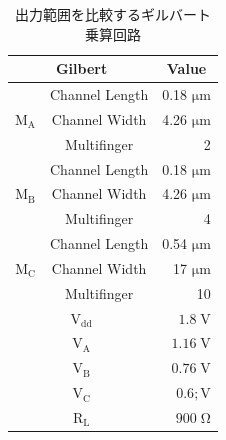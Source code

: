         \begin{table}[!b]
                \centering
                \caption{出力範囲を比較するギルバート乗算回路}
                \label{table:3_prev_com_param}
                \begin{tabular}{c|c|r}
                    \hline
                    \multicolumn{2}{c}{Gilbert}   & \multicolumn{1}{c}{Value}     \\
                    \hline\hline
                    &   Channel Length   &   0.18 $\mathrm{\mu m}$   \\
                    \cline{2-3}
                    $\mathrm{M_{A}}$   &   Channel Width   &   4.26 $\mathrm{\mu m}$   \\
                    \cline{2-3}
                        &   Multifinger   & 2    \\
                    \hline
                    &   Channel Length   &   0.18 $\mathrm{\mu m}$   \\
                    \cline{2-3}
                    $\mathrm{M_{B}}$   &   Channel Width   &   4.26 $\mathrm{\mu m}$   \\
                    \cline{2-3}
                        &   Multifinger   & 4    \\
                    \hline
                    &   Channel Length   &   0.54 $\mathrm{\mu m}$   \\
                    \cline{2-3}
                    $\mathrm{M_{C}}$   &   Channel Width   &   17 $\mathrm{\mu m}$   \\
                    \cline{2-3}
                        &   Multifinger   & 10    \\
                    \hline
                    \multicolumn{2}{c|}{$\mathrm{V_{dd}}$} &   $1.8\;\mathrm{V}$   \\
                    \hline
                    \multicolumn{2}{c|}{$\mathrm{V_{A}}$} &   $1.16\;\mathrm{V}$   \\
                    \hline
                    \multicolumn{2}{c|}{$\mathrm{V_{B}}$} &   $0.76\;\mathrm{V}$   \\
                    \hline
                    \multicolumn{2}{c|}{$\mathrm{V_{C}}$} &   $0.6;\mathrm{V}$   \\
                    \hline
                    \multicolumn{2}{c|}{$\mathrm{R_{L}}$} &   $900\;\mathrm{\Omega}$   \\
                    \hline
                \end{tabular}
        \end{table}
